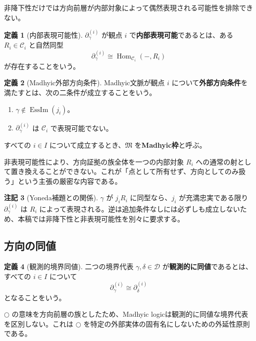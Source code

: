 \documentclass[a4paper,11pt]{ltjsarticle}
\theoremstyle{definition}
\newtheorem{definition}{定義}[section]
\newtheorem{remark}[definition]{注記}
\theoremstyle{plain}
\newcommand{\EssIm}{\operatorname{EssIm}}
\newcommand{\Hom}{\operatorname{Hom}}
\newcommand{\dfix}{\bigcirc}
\begin{document}
非降下性だけでは方向前層が内部対象によって偶然表現される可能性を排除できない。

\begin{definition}[内部表現可能性]
$\partial_\gamma^{(i)}$ が観点 $i$ で\textbf{内部表現可能}であるとは、ある $R_i\in\mathcal C_i$ と自然同型
\begin{equation}
 \partial_\gamma^{(i)}
 \cong\Hom_{\mathcal C_i}(-,R_i)
 \label{eq:internal-representability}
\end{equation}
が存在することをいう。
\end{definition}

\begin{definition}[Madhyic外部方向条件]
Madhyic文脈が観点 $i$ について\textbf{外部方向条件}を満たすとは、次の二条件が成立することをいう。
\begin{enumerate}
 \item $\gamma\notin\EssIm(j_i)$。
 \item $\partial_\gamma^{(i)}$ は $\mathcal C_i$ で表現可能でない。
\end{enumerate}
すべての $i\in I$ について成立するとき、$\mathfrak M$ を\textbf{Madhyic枠}と呼ぶ。
\end{definition}

非表現可能性により、方向証拠の族全体を一つの内部対象 $R_i$ への通常の射として置き換えることができない。これが「点として所有せず、方向としてのみ扱う」という主張の厳密な内容である。

\begin{remark}[Yoneda補題との関係]
$\gamma$ が $j_iR_i$ に同型なら、$j_i$ が充満忠実である限り $\partial_\gamma^{(i)}$ は $R_i$ によって表現される。逆は追加条件なしには必ずしも成立しないため、本稿では非降下性と非表現可能性を別々に要求する\cite{MacLane1998,Riehl2016}。
\end{remark}

\subsection{方向の同値}

\begin{definition}[観測的境界同値]
二つの境界代表 $\gamma,\delta\in\mathcal D$ が\textbf{観測的に同値}であるとは、すべての $i\in I$ について
\[
 \partial_\gamma^{(i)}
 \cong
 \partial_\delta^{(i)}
\]
となることをいう。
\end{definition}

$\dfix$ の意味を方向前層の族としたため、Madhyic logicは観測的に同値な境界代表を区別しない。これは $\dfix$ を特定の外部実体の固有名にしないための外延性原則である。
\end{document}
